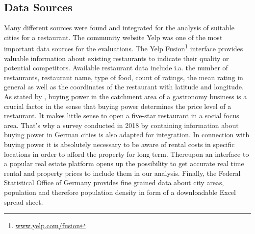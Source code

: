\subsection{Data Sources}
\label{subsec:sources}
Many different sources were found and integrated for the analysis of suitable cities for a restaurant. The community website Yelp was one of the most important data sources for the evaluations. The Yelp Fusion\footnote{\href{https://www.yelp.com/fusion}{www.yelp.com/fusion}} interface provides valuable information about existing restaurants to indicate their quality or potential competitors. Available restaurant data include i.a. the number of restaurants, restaurant name, type of food, count of ratings, the mean rating in general as well as the coordinates of the restaurant with latitude and longitude.%
\newline
As stated by \cite{locana}, buying power in the catchment area of a gastronomy business is a crucial factor in the sense that buying power determines the price level of a restaurant. It makes little sense to open a five-star restaurant in a social focus area. That's why a survey conducted in 2018 by \cite{buyingpower} containing information about buying power in German cities is also adapted for integration.
\newline
In connection with buying power it is absolutely necessary to be aware of rental costs in specific locations in order to afford the property for long term\cite{locana}. Thereupon an interface to a popular real estate platform \cite{ImmoScout} opens up the possibility to get accurate real time rental and property prices to include them in our analysis.
\newline
Finally, the Federal Statistical Office of Germany provides fine grained data about city areas, population and therefore population density in form of a downloadable Excel spread sheet.\cite{destatis}

